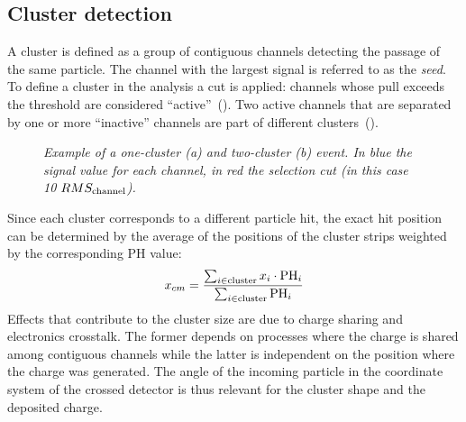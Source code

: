 \subsection{Cluster detection}\label{subs:cluster}
A cluster is defined as a group of contiguous channels detecting the passage of
the same particle. The channel with the largest signal is referred to as the
{\it seed}. To define a cluster in the analysis a cut is applied: channels whose
pull exceeds the threshold are considered ``active''~(). Two
active channels that are separated by one or more ``inactive'' channels are
part of different clusters~().
\begin{figure}[!htbp]
  \centering 
  \quad
  \caption{\textit{Example of a one-cluster (a) and two-cluster (b) event. In
      blue the signal value for each channel, in red the selection cut (in this
      case 10 $RMS_{\rm channel}$).}}
  \label{fig:cluster}
\end{figure}
Since each cluster corresponds to a different particle hit, the exact hit position
can be determined by the average of the positions of the cluster strips weighted by the corresponding PH value:
\begin{equation}\label{eq:cog}
x_{cm} = \frac{\sum_{i\in{\rm cluster}} x_i\cdot {\rm PH}_i}{\sum_{i\in{\rm cluster}} {\rm PH}_i}
\end{equation}
Effects that contribute to the cluster size are due to charge sharing and
electronics crosstalk. The former depends on processes where the charge is
shared among contiguous channels while the latter is independent on the position
where the charge was generated. The angle of the incoming particle in the
coordinate system of the crossed detector is thus relevant for the cluster shape
and
the deposited charge.\\

